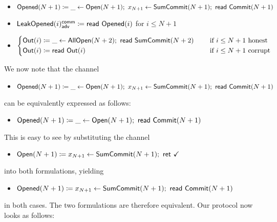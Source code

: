 \begin{itemize}
\item {\color{red} $\Opened(N+1) \coloneqq \_ \leftarrow \Open(N+1); \ x_{N+1} \leftarrow \SumCommit(N+1); \ \read{\Commit(N+1)}$} 
\item {\color{red} $\mathsf{LeakOpened}(i)^{\mathsf{comm}}_{\mathsf{adv}} \coloneqq \mathsf{read} \ \mathsf{Opened}(i)$ for $i \leq N+1$}
\item $\begin{cases*} \Out(i) \coloneqq \_ \leftarrow \AllOpen(N+2); \ \read{\SumCommit(N+2)} & \hspace{10pt} \text{if $i \leq N+1$ honest} \\ \Out(i) \coloneqq \read{\Out(i)} & \hspace{10pt} \text{if $i \leq N+1$ corrupt} \end{cases*}$
\end{itemize}

\noindent We now note that the channel
\begin{itemize}
\item {\color{red} $\Opened(N+1) \coloneqq \_ \leftarrow \Open(N+1); \ x_{N+1} \leftarrow \SumCommit(N+1); \ \read{\Commit(N+1)}$} 
\end{itemize}
can be equivalently expressed as follows:
\begin{itemize}
\item {\color{red} $\mathsf{Opened}(N+1) \coloneqq \_ \leftarrow \mathsf{Open}(N+1); \ \mathsf{read} \ \mathsf{Commit}(N+1)$}
\end{itemize}
This is easy to see by substituting the channel
\begin{itemize}
\item {\color{teal} $\mathsf{Open}(N+1) \coloneqq x_{N+1} \leftarrow \mathsf{SumCommit}(N+1); \ \mathsf{ret} \ \checkmark$}
\end{itemize}
into both formulations, yielding
\begin{itemize}
\item {\color{red} $\Opened(N+1) \coloneqq x_{N+1} \leftarrow \SumCommit(N+1); \ \read{\Commit(N+1)}$} 
\end{itemize}
in both cases. The two formulations are therefore equivalent. Our protocol now looks as follows:

